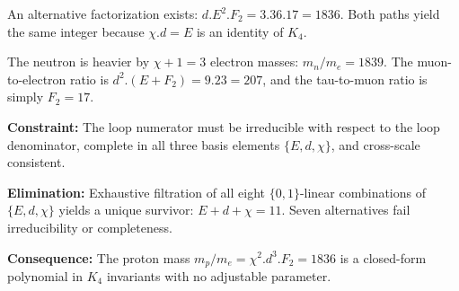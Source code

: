 \documentclass[11pt,a4paper]{book}
\def\cdot{.}%
\newcommand{\VoidRef}[2]{\textit{#2} (in \textit{Void})}
\begin{document}
An alternative factorization exists: $d \cdot E^2 \cdot F_2 = 3 \cdot 36 \cdot 17 = 1836$. Both paths yield the same integer because $\chi \cdot d = E$ is an identity of $K_4$.%

The neutron is heavier by $\chi + 1 = 3$ electron masses: $m_n/m_e = 1839$. The muon-to-electron ratio is $d^2 \cdot (E + F_2) = 9 \cdot 23 = 207$, and the tau-to-muon ratio is simply $F_2 = 17$.

\textbf{Constraint:} The loop numerator must be irreducible with respect to the loop denominator, complete in all three basis elements $\{E, d, \chi\}$, and cross-scale consistent.

\textbf{Elimination:} Exhaustive filtration of all eight $\{0,1\}$-linear combinations of $\{E, d, \chi\}$ yields a unique survivor: $E + d + \chi = 11$. Seven alternatives fail irreducibility or completeness.

\textbf{Consequence:} The proton mass $m_p/m_e = \chi^2 \cdot d^3 \cdot F_2 = 1836$ is a closed-form polynomial in $K_4$ invariants with no adjustable parameter.
\end{document}
